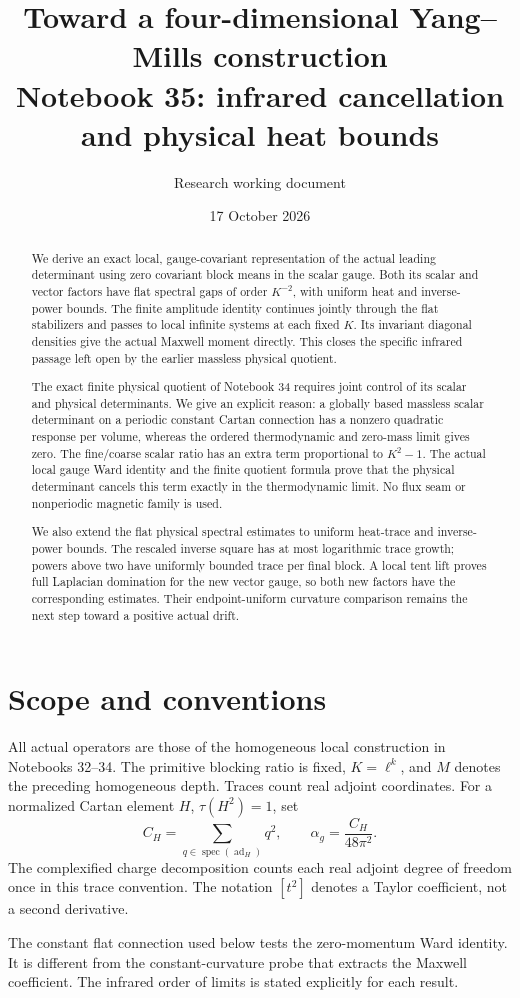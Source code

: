 \documentclass[11pt]{article}
\title{Toward a four-dimensional Yang--Mills construction\\
\large Notebook 35: infrared cancellation and physical heat bounds}
\author{Research working document}
\date{17 October 2026}
\theoremstyle{remark}
\begin{document}
\maketitle
\begin{abstract}
We derive an exact local, gauge-covariant representation
of the actual leading determinant using zero covariant
block means in the scalar gauge. Both its scalar and
vector factors have flat spectral gaps of order
\(K^{-2}\), with uniform heat and inverse-power bounds.
The finite amplitude identity continues jointly through
the flat stabilizers and passes to local infinite
systems at each fixed \(K\). Its invariant diagonal
densities give the actual Maxwell moment directly.
This closes the specific infrared passage left open
by the earlier massless physical quotient.

The exact finite physical quotient of Notebook 34 requires
joint control of its scalar and physical determinants.
We give an explicit reason: a globally based massless
scalar determinant on a periodic constant Cartan connection
has a nonzero quadratic response per volume, whereas the
ordered thermodynamic and zero-mass limit gives zero.
The fine/coarse scalar ratio has an extra term proportional
to \(K^2-1\). The actual local gauge Ward identity and
the finite quotient formula prove that the physical
determinant cancels this term exactly in the thermodynamic
limit. No flux seam or nonperiodic magnetic family is used.

We also extend the flat physical spectral estimates to
uniform heat-trace and inverse-power bounds. The
rescaled inverse square has at most logarithmic trace
growth; powers above two have uniformly bounded trace
per final block. A local tent lift proves full
Laplacian domination for the new vector gauge, so
both new factors have the corresponding estimates.
Their endpoint-uniform curvature comparison remains
the next step toward a positive actual drift.
\end{abstract}

\section*{Scope and conventions}

All actual operators are those of the homogeneous local
construction in Notebooks 32--34. The primitive blocking
ratio is fixed, \(K=\ell^k\), and \(M\) denotes the
preceding homogeneous depth. Traces count real adjoint
coordinates. For a normalized Cartan element \(H\),
\(\tau(H^2)=1\), set
\[
 C_H=\sum_{q\in\operatorname{spec}(\operatorname{ad}_H)}q^2,
 \qquad \alpha_g=\frac{C_H}{48\pi^2}.
\]
The complexified charge decomposition counts each real
adjoint degree of freedom once in this trace convention.
The notation \([t^2]\) denotes a Taylor coefficient,
not a second derivative.

The constant flat connection used below tests the
zero-momentum Ward identity. It is different from the
constant-curvature probe that extracts the Maxwell
coefficient. The infrared order of limits is stated
explicitly for each result.
\end{document}
